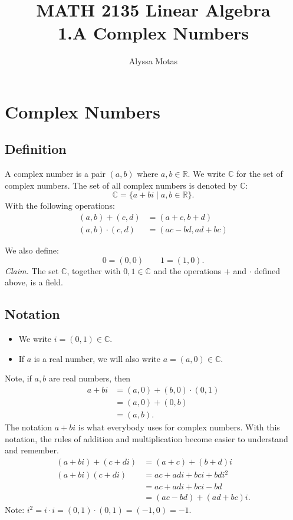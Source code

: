 \documentclass[11pt]{article}
\title{\textbf{MATH 2135 Linear Algebra} \\ 1.A Complex Numbers}
\author{Alyssa Motas}
\begin{document}
    \maketitle

    \pagebreak

    \tableofcontents

    \pagebreak

    \section{Complex Numbers}

    \subsection{Definition}
    A complex number is a pair \((a,b)\) where \(a,b \in \mathbb{R}\). We write \(\mathbb{C}\) for the set of complex numbers. The set of all complex numbers is denoted by \(\mathbb{C}\): \[\mathbb{C} = \{a + bi \mid a,b \in \mathbb{R}\}.\]With the following operations:
    \begin{align*}
        (a,b) + (c,d)     &= (a+c, b+d)    \\
        (a,b) \cdot (c,d) &= (ac-bd,ad+bc) 
    \end{align*}

    We also define: \[0 = (0,0) \qquad 1 = (1,0).\]
    \emph{Claim.} The set \(\mathbb{C}\), together with \(0,1 \in \mathbb{C}\) and the operations \(+\) and \(\cdot\) defined above, is a field.

    \subsection{Notation}
    \begin{itemize}
        \item We write \(i = (0,1) \in \mathbb{C}.\)
        \item If $a$ is a real number, we will also write \(a = (a,0) \in \mathbb{C}\).
    \end{itemize}
    Note, if \(a,b\) are real numbers, then
    \begin{align*}
        a + bi &= (a,0) + (b,0) \cdot (0,1) \\
               &= (a,0) + (0,b)             \\
               &= (a,b).
    \end{align*}
    The notation \(a + bi\) is what everybody uses for complex numbers. With this notation, the rules of addition and multiplication become easier to understand and remember.
    \begin{align*}
        (a+bi)+(c+di) &= (a+c) + (b+d)i         \\
        (a+bi)(c+di)  &= ac + adi + bci + bdi^2 \\
                      &= ac + adi + bci - bd    \\
                      &= (ac - bd) + (ad + bc)i.
    \end{align*}
    Note: \(i^2 = i \cdot i = (0,1) \cdot (0,1) = (-1,0) = -1.\)
\end{document}
